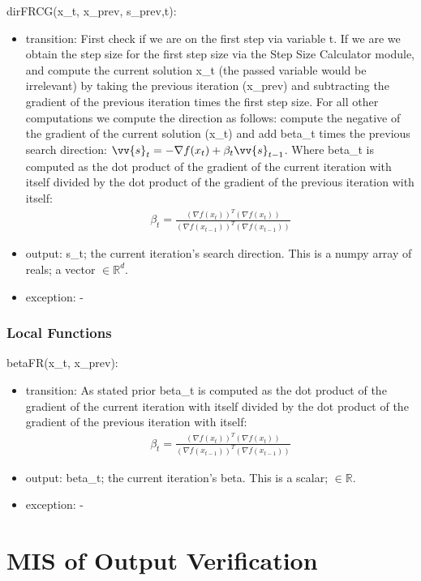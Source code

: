 \documentclass[12pt, titlepage]{article}
\begin{document}
\noindent dirFRCG(x\_t, x\_prev, s\_prev,t):
\begin{itemize}
\item transition: First check if we are on the first step via variable t. If we are we obtain the step size for the first step size via the Step Size Calculator module, and compute the current solution x\_t (the passed variable would be irrelevant) by taking the previous iteration (x\_prev) and subtracting the gradient of the previous iteration times the first step size. For all other computations we compute the direction as follows:  compute the negative of the gradient of the current solution (x\_t) and add beta\_t times the previous search direction: $\vv{s}_{t} = - \nabla f(x_t) + \beta_t \vv{s}_{t-1}$. Where beta\_t is computed as the dot product of the gradient of the current iteration with itself divided by the dot product of the gradient of the previous iteration with itself:
\begin{align*}
    \beta_t = \frac{(\nabla f(x_{t}))^{T}(\nabla f(x_{t})) }{(\nabla f(x_{t-1}))^{T}(\nabla f(x_{t-1}))}
\end{align*}
\item output: s\_t; the current iteration's search direction. This is a numpy array of reals; a vector $\in \mathbb{R}^d$. 
\item exception: - 
\end{itemize}

\subsubsection{Local Functions}
\noindent betaFR(x\_t, x\_prev):
\begin{itemize}
\item transition: As stated prior beta\_t is computed as the dot product of the gradient of the current iteration with itself divided by the dot product of the gradient of the previous iteration with itself:
\begin{align*}
    \beta_t = \frac{(\nabla f(x_{t}))^{T}(\nabla f(x_{t})) }{(\nabla f(x_{t-1}))^{T}(\nabla f(x_{t-1}))}
\end{align*}
\item output: beta\_t; the current iteration's beta. This is a scalar; $\in \mathbb{R}$. 
\item exception: - 
\end{itemize}

\section{MIS of Output Verification} \label{Module:OutputVerify}
\end{document}
